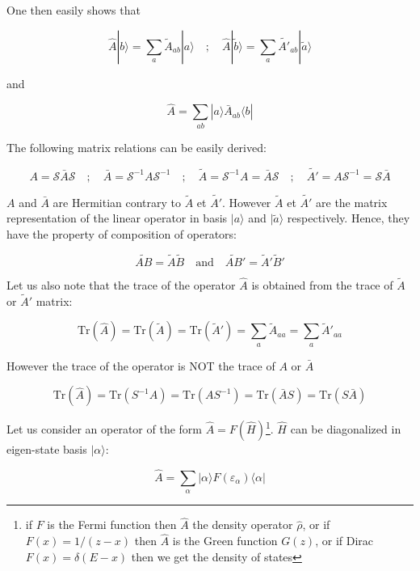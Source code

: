 \documentclass{article}
\newcommand{\bra}[1]{\langle #1|}
\newcommand{\ket}[1]{|#1\rangle}
\newcommand{\op}[1]{\hat{#1}}
\begin{document}
One then easily shows that

\[ \op{A}\ket{b}=\sum_a \tilde{A}_{ab} \ket{a} \quad ; \quad 
   \op{A}\ket{\tilde{b}}=\sum_a \tilde{A'}_{ab} \ket{\tilde{a}}\]

and

\[ \op{A}=\sum_{ab} \ket{a}\bar{A}_{ab} \bra{b} \]


\noindent
The following matrix relations can be easily derived:

\[   A=\mathcal{S}\bar{A}\mathcal{S} \quad ; \quad 
    \bar{A}=\mathcal{S}^{-1}A\mathcal{S}^{-1} \quad ; \quad 
    \tilde{A}=\mathcal{S}^{-1}A=\bar{A}\mathcal{S} \quad ; \quad 
    \tilde{A'}=A\mathcal{S}^{-1}=\mathcal{S}\bar{A} \]

 
 \noindent
$A$ and $\bar{A}$ are Hermitian contrary to $\tilde{A}$ et $\tilde{A'}$. However  $\tilde{A}$ et $\tilde{A'}$ are the matrix representation of the linear operator in basis $\ket{a}$ and $\ket{\tilde{a}}$ respectively. Hence, they have the property of composition of operators:

\[ \widetilde{AB}=\tilde{A}\tilde{B} \quad \text{and} \quad  \widetilde{AB}'=\tilde{A}'\tilde{B}'\]

 \noindent
Let us also note that the trace of the operator $\op{A}$ is obtained from the trace of $\tilde{A}$ or $\tilde{A}'$ matrix:

\[\text{Tr}(\op{A})=\text{Tr}(\tilde{A})=\text{Tr}(\tilde{A}')=\sum_a \tilde{A}_{aa}=\sum_a \tilde{A}'_{aa}\]

 \noindent
However the trace of the operator is NOT the trace of $A$ or $\bar{A}$

\[\text{Tr}(\op{A})=\text{Tr}(S^{-1}A)=\text{Tr}(AS^{-1})=\text{Tr}(\bar{A}S)=\text{Tr}(S\bar{A})\]


\smallskip
\noindent
Let us consider an operator of the form
$\op{A}=F(\op{H})$\footnote{if $F$ is the Fermi function then
 $\op{A}$ the density operator $\op{\rho}$, or if $F(x)=1/(z-x)$ then  $\op{A}$ is the Green function $G(z)$, or if  Dirac $F(x)=\delta(E-x)$ then we get the density of states}.  $\op{H}$ can be diagonalized in eigen-state basis $\ket{\alpha}$:

\[ \op{A}=\sum_{\alpha} \ket{\alpha} F(\varepsilon_{\alpha}) \bra{\alpha} \]
\end{document}

